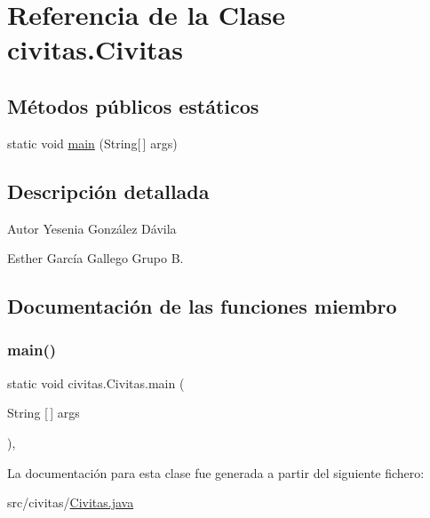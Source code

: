 \hypertarget{classcivitas_1_1Civitas}{}\section{Referencia de la Clase civitas.\+Civitas}
\label{classcivitas_1_1Civitas}
\subsection*{Métodos públicos estáticos}
\begin{DoxyCompactItemize}
\item 
static void \hyperlink{classcivitas_1_1Civitas_aafbfc82fe65ead98cdfa0fecd0e38bfc}{main} (String\mbox{[}$\,$\mbox{]} args)
\end{DoxyCompactItemize}


\subsection{Descripción detallada}
\begin{DoxyAuthor}{Autor}
Yesenia González Dávila 

Esther García Gallego Grupo B. 
\end{DoxyAuthor}


\subsection{Documentación de las funciones miembro}
\mbox{\label{classcivitas_1_1Civitas_aafbfc82fe65ead98cdfa0fecd0e38bfc}} 
\subsubsection{\texorpdfstring{main()}{main()}}
{\footnotesize\ttfamily static void civitas.\+Civitas.\+main (\begin{DoxyParamCaption}\item[{String \mbox{[}$\,$\mbox{]}}]{args }\end{DoxyParamCaption})\hspace{0.3cm}{\ttfamily [inline]}, {\ttfamily [static]}}



La documentación para esta clase fue generada a partir del siguiente fichero\+:\begin{DoxyCompactItemize}
\item 
src/civitas/\hyperlink{Civitas_8java}{Civitas.\+java}\end{DoxyCompactItemize}
